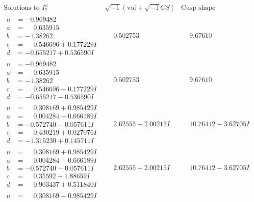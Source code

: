 \documentclass[1p]{elsarticle_modified}
\theoremstyle{definition}
\newcommand{\I}{\sqrt{-1}}
\begin{document}
$$\begin{array}{c|c|c}  
\text{Solutions to }I^u_{2}& \I (\text{vol} + \sqrt{-1}CS) & \text{Cusp shape}\\
 \hline 
\begin{aligned}
u &= -0.969482\phantom{ +0.000000I} \\
a &= \phantom{-}0.635915\phantom{ +0.000000I} \\
b &= -1.38262\phantom{ +0.000000I} \\
c &= \phantom{-}0.546696 + 0.177229 I \\
d &= -0.655217 + 0.536590 I\end{aligned}
 & \phantom{-}0.502753\phantom{ +0.000000I} & \phantom{-}9.67610\phantom{ +0.000000I} \\ \hline\begin{aligned}
u &= -0.969482\phantom{ +0.000000I} \\
a &= \phantom{-}0.635915\phantom{ +0.000000I} \\
b &= -1.38262\phantom{ +0.000000I} \\
c &= \phantom{-}0.546696 - 0.177229 I \\
d &= -0.655217 - 0.536590 I\end{aligned}
 & \phantom{-}0.502753\phantom{ +0.000000I} & \phantom{-}9.67610\phantom{ +0.000000I} \\ \hline\begin{aligned}
u &= \phantom{-}0.308169 + 0.985429 I \\
a &= \phantom{-}0.004284 - 0.666189 I \\
b &= -0.572740 - 0.057611 I \\
c &= \phantom{-}0.430219 + 0.027076 I \\
d &= -1.315230 + 0.145711 I\end{aligned}
 & \phantom{-}2.62555 + 2.00215 I & \phantom{-}10.76412 - 3.62705 I \\ \hline\begin{aligned}
u &= \phantom{-}0.308169 + 0.985429 I \\
a &= \phantom{-}0.004284 - 0.666189 I \\
b &= -0.572740 - 0.057611 I \\
c &= \phantom{-}0.35592 + 1.88659 I \\
d &= \phantom{-}0.903437 + 0.511840 I\end{aligned}
 & \phantom{-}2.62555 + 2.00215 I & \phantom{-}10.76412 - 3.62705 I \\ \hline\begin{aligned}
u &= \phantom{-}0.308169 - 0.985429 I \\

\end{aligned}
\end{array}$$
\end{document}
